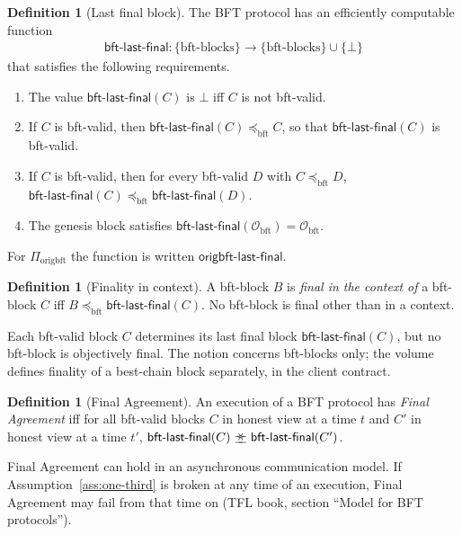 \documentclass[11pt,a4paper]{article}
\theoremstyle{definition}
\newtheorem{definition}[theorem]{Definition}
\newcommand{\bft}{\mathrm{bft}}
\newcommand{\Origin}{\mathcal{O}}
\newcommand{\Obft}{\Origin_{\bft}}
\newcommand{\agrees}{\mathrel{\preceq\mkern-9mu\succeq}}
\newcommand{\Piorigbft}{\Pi_{\mathrm{origbft}}}
\newcommand{\bftlastfinal}{\mathsf{bft\text{-}last\text{-}final}}
\newcommand{\origbftlastfinal}{\mathsf{origbft\text{-}last\text{-}final}}
\begin{document}
\begin{definition}[Last final block]\label{def:blf}
The BFT protocol has an efficiently computable function
\begin{gather*}
  \bftlastfinal \colon \{\text{bft-blocks}\} \to
    \{\text{bft-blocks}\} \cup \{\bot\}
\end{gather*}
that satisfies the following requirements.
\begin{enumerate}[label=(\roman*)]
\item The value $\bftlastfinal(C)$ is $\bot$ iff $C$ is not bft-valid.
\item If $C$ is bft-valid, then $\bftlastfinal(C) \preceq_{\bft} C$, so that
  $\bftlastfinal(C)$ is bft-valid.
\item If $C$ is bft-valid, then for every bft-valid $D$ with
  $C \preceq_{\bft} D$, $\bftlastfinal(C) \preceq_{\bft} \bftlastfinal(D)$.
\item The genesis block satisfies $\bftlastfinal(\Obft) = \Obft$.
\end{enumerate}
For $\Piorigbft$ the function is written $\origbftlastfinal$.
\end{definition}

\begin{definition}[Finality in context]\label{def:final-context}
A bft-block $B$ is \emph{final in the context of} a bft-block $C$ iff
$B \preceq_{\bft} \bftlastfinal(C)$. No bft-block is final other than in a
context.
\end{definition}

Each bft-valid block $C$ determines its last final block $\bftlastfinal(C)$,
but no bft-block is objectively final. The notion concerns bft-blocks only;
the volume defines finality of a best-chain block separately, in the client
contract.

\begin{definition}[Final Agreement]\label{def:fa}
An execution of a BFT protocol has \emph{Final Agreement} iff for all
bft-valid blocks $C$ in honest view at a time $t$ and $C'$ in honest view at
a time $t'$, $\bftlastfinal(C) \agrees \bftlastfinal(C')$.
\end{definition}

Final Agreement can hold in an asynchronous communication model. If
Assumption~\ref{ass:one-third} is broken at any time of an execution, Final
Agreement may fail from that time on (TFL book, section ``Model for BFT
protocols'').
\end{document}
